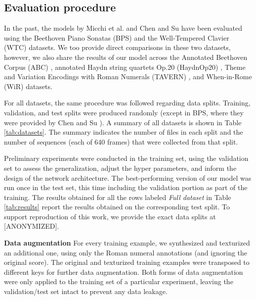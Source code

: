 \subsection{Evaluation procedure}

In the past, the models by Micchi et al. \cite{micchi_not_2020} and Chen and Su \cite{chen_attend_2021} have been evaluated using the Beethoven Piano Sonatas (BPS) and the Well-Tempered Clavier (WTC) datasets. We too provide direct comparisons in these two datasets, however, we also share the results of our model across the Annotated Beethoven Corpus (ABC) \cite{neuwirth_annotated_2018}, annotated Haydn string quartets Op.20 (HaydnOp20) \cite{napoles_lopez_automatic_2017}, Theme and Variation Encodings with Roman Numerals (TAVERN) \cite{devaney_theme_2015}, and When-in-Rome (WiR) \cite{gotham_romantext_2019} datasets. 

For all datasets, the same procedure was followed regarding data splits. 
 Training, validation, and test splits were produced randomly (except in BPS, where they were provided by Chen and Su \cite{chen_functional_2018}).
A summary of all datasets is shown in Table \ref{tab:datasets}. The summary indicates the number of files in each split and the number of sequences (each of 640 frames) that were collected from that split.


Preliminary experiments were conducted in the training set, using the validation set to assess the generalization, adjust the hyper parameters, and inform the design of the network architecture.
The best-performing version of our model was run once in the test set, this time including the validation portion as part of the training.
The results obtained for all the rows labeled \emph{Full dataset} in Table \ref{tab:results} report the results obtained on the corresponding test split. 
To support reproduction of this work, we provide the exact data splits at [ANONYMIZED].

\textbf{Data augmentation} For every training example, we synthesized and texturized an additional one, using only the Roman numeral annotations (and ignoring the original score). The original and texturized training examples were transposed to different keys for further data augmentation. Both forms of data augmentation were only applied to the training set of a particular experiment, leaving the validation/test set intact to prevent any data leakage.


